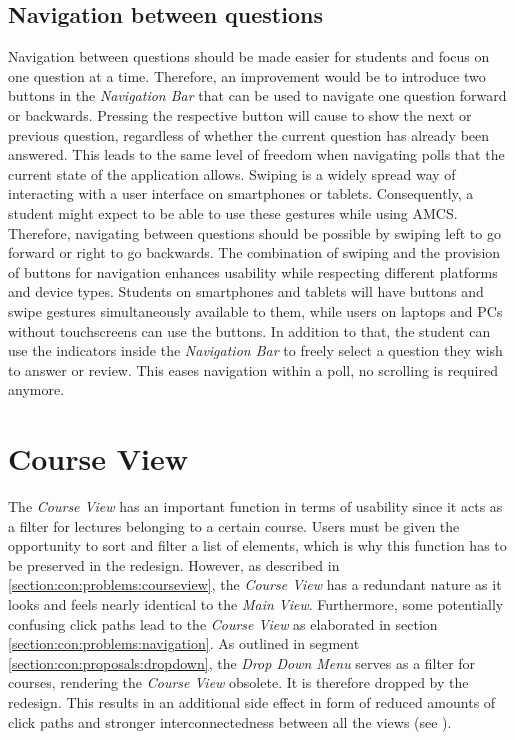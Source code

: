 \subsection{Navigation between questions}

Navigation between questions should be made easier for students and focus on one question at a time. Therefore, an improvement would be to introduce two buttons in the \emph{Navigation Bar} that can be used to navigate one question forward or backwards. Pressing the respective button will cause to show the next or previous question, regardless of whether the current question has already been answered. This leads to the same level of freedom when navigating polls that the current state of the application allows.
\newline
\newline
Swiping is a widely spread way of interacting with a user interface on smartphones or tablets. Consequently, a student might expect to be able to use these gestures while using AMCS. Therefore, navigating between questions should be possible by swiping left to go forward or right to go backwards. The combination of swiping and the provision of buttons for navigation enhances usability while respecting different platforms and device types. Students on smartphones and tablets will have buttons and swipe gestures simultaneously available to them, while users on laptops and PCs without touchscreens can use the buttons.
In addition to that, the student can use the indicators inside the \emph{Navigation Bar} to freely select a question they wish to answer or review. This eases navigation within a poll, no scrolling is required anymore.


\section{Course View}
The \emph{Course View} has an important function in terms of usability since it acts as a filter for lectures belonging to a certain course. Users must be given the opportunity to sort and filter a list of elements, which is why this function has to be preserved in the redesign. However, as described in \autoref{section:con:problems:courseview}, the \emph{Course View} has a redundant nature as it looks and feels nearly identical to the \emph{Main View}.
Furthermore, some potentially confusing click paths lead to the \emph{Course View} as elaborated in section \autoref{section:con:problems:navigation}.
As outlined in segment \autoref{section:con:proposals:dropdown}, the \emph{Drop Down Menu} serves as a filter for courses, rendering the \emph{Course View} obsolete. It is therefore dropped by the redesign. This results in an additional side effect in form of reduced amounts of click paths and stronger interconnectedness between all the views (see \todosct).
